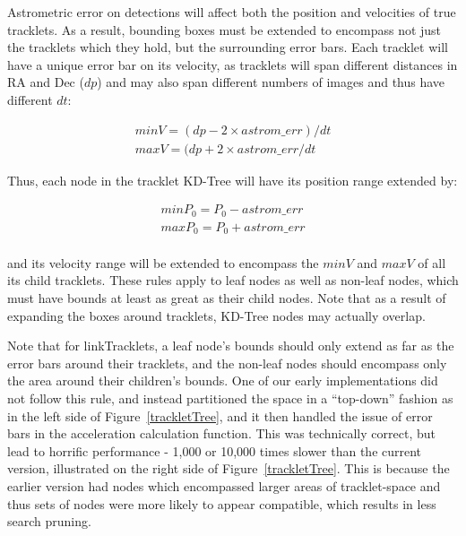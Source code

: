 Astrometric error on detections will affect both the position and
velocities of true tracklets.  As a result, bounding boxes must be
extended to encompass not just the tracklets which they hold, but the
surrounding error bars.  Each tracklet will have a unique error bar on
its velocity, as tracklets will span different distances in RA and Dec
($dp$) and may also span different numbers of images and thus have
different $dt$:

\begin{eqnarray}
minV = (dp - 2\times astrom\_err)/dt  \\
maxV = (dp + 2\times astrom\_err /dt
\end{eqnarray}

Thus, each node in the tracklet KD-Tree will have its position range extended by:

\begin{eqnarray}
minP_0 = P_0 - astrom\_err \\
maxP_0 = P_0 + astrom\_err  
\end{eqnarray}
\\ and its velocity range will be extended to encompass the $minV$ and
$maxV$ of all its child tracklets.  These rules apply to leaf nodes as
well as non-leaf nodes, which must have bounds at least as great as
their child nodes.  Note that as a result of expanding the boxes
around tracklets, KD-Tree nodes may actually overlap.

Note that for linkTracklets, a leaf node's bounds should only extend
as far as the error bars around their tracklets, and the non-leaf
nodes should encompass only the area around their children's bounds.
One of our early implementations did not follow this rule, and instead
partitioned the space in a ``top-down'' fashion as in the left side of
Figure~\ref{trackletTree}, and it then handled the issue of error bars
in the acceleration calculation function.  This was technically
correct, but lead to horrific performance - 1,000 or 10,000 times
slower than the current version, illustrated on the right side of
Figure~\ref{trackletTree}.  This is because the earlier version had
nodes which encompassed larger areas of tracklet-space and thus sets
of nodes were more likely to appear compatible, which results in less
search pruning.

